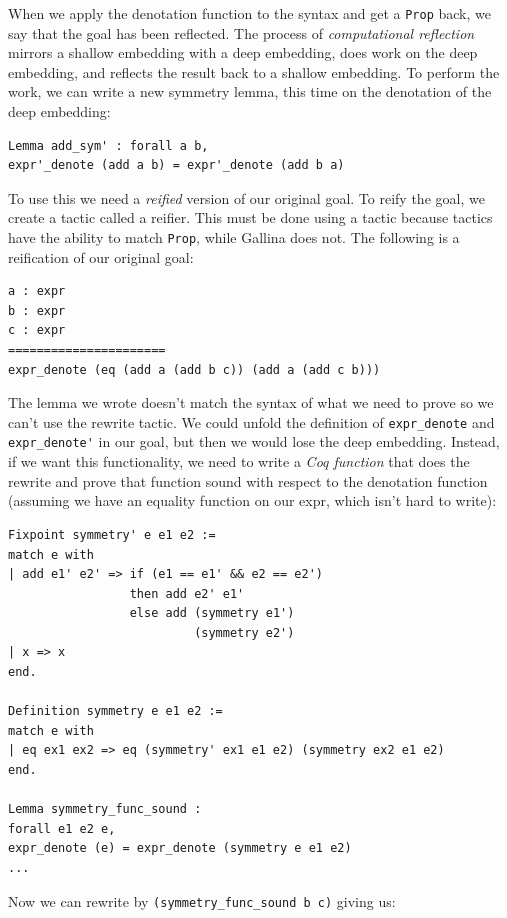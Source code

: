 \documentclass{puthesis}
\begin{document}
When we apply
the denotation function to the syntax and get a \lstinline|Prop| back,
we say that the goal has been reflected. The process of
\emph{computational reflection} mirrors a shallow embedding with a
deep embedding, does work on the deep embedding, and reflects the
result back to a shallow embedding. To perform the work, we can write a
new symmetry lemma, this time on the denotation of the deep embedding:

\begin{lstlisting}
Lemma add_sym' : forall a b, 
expr'_denote (add a b) = expr'_denote (add b a)
\end{lstlisting}

To use this we need a \emph{reified} version of our original goal. To
reify the goal, we create a tactic called a reifier. This must be done
using a tactic because tactics have the ability to match
\lstinline|Prop|, while Gallina does not. The following is a
reification of our original goal:


\begin{lstlisting}
a : expr
b : expr
c : expr
======================
expr_denote (eq (add a (add b c)) (add a (add c b)))  
\end{lstlisting}

The lemma we wrote doesn't match the syntax of what we need to prove
so we can't use the rewrite tactic. We could unfold the definition of
\lstinline|expr_denote| and \lstinline|expr_denote'| in our goal, but
then we would lose the deep embedding. Instead, if we want this
functionality, we need to write a \emph{Coq function} that does the
rewrite and prove that function sound with respect to the denotation
function (assuming we have an equality function on our expr, which
isn't hard to write):

\begin{lstlisting}
Fixpoint symmetry' e e1 e2 := 
match e with
| add e1' e2' => if (e1 == e1' && e2 == e2') 
                 then add e2' e1' 
                 else add (symmetry e1') 
                          (symmetry e2')
| x => x
end.

Definition symmetry e e1 e2 :=
match e with
| eq ex1 ex2 => eq (symmetry' ex1 e1 e2) (symmetry ex2 e1 e2)
end.

Lemma symmetry_func_sound : 
forall e1 e2 e,
expr_denote (e) = expr_denote (symmetry e e1 e2)
...
\end{lstlisting}

Now we can rewrite by \lstinline|(symmetry_func_sound b c)| giving us:
\end{document}
